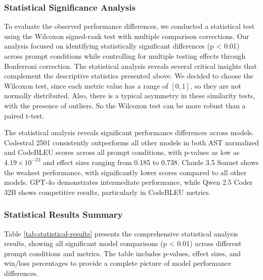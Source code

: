 \subsubsection{Statistical Significance Analysis}

To evaluate the observed performance differences, we conducted a statistical test using the Wilcoxon signed-rank test with multiple comparison corrections. Our analysis focused on identifying statistically significant differences (p < 0.01) across prompt conditions while controlling for multiple testing effects through Bonferroni correction. The statistical analysis reveals several critical insights that complement the descriptive statistics presented above.
We decided to choose the Wilcoxon test, since each metric value has a range of $[0,1]$, so they are not normally distributed. Also, there is a typical asymmetry in these similarity tests, with the presence of outliers. So the Wilcoxon test can be more robust than a paired t-test.

The statistical analysis reveals significant performance differences across models. Codestral 2501 consistently outperforms all other models in both AST normalized and CodeBLEU scores across all prompt conditions, with p-values as low as $4.19 \times 10^{-23}$ and effect sizes ranging from 0.185 to 0.738. Claude 3.5 Sonnet shows the weakest performance, with significantly lower scores compared to all other models. GPT-4o demonstrates intermediate performance, while Qwen 2.5 Coder 32B shows competitive results, particularly in CodeBLEU metrics.

\subsubsection{Statistical Results Summary}
Table \ref{tab:statistical-results} presents the comprehensive statistical analysis results, showing all significant model comparisons (p < 0.01) across different prompt conditions and metrics. The table includes p-values, effect sizes, and win/loss percentages to provide a complete picture of model performance differences.

